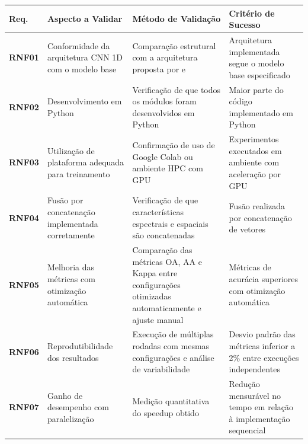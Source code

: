 \begin{quadro}[H]
    \centering
    \caption{Plano de verificação dos requisitos não funcionais}
    \begin{tabular}{|p{}|p{}|p{}|p{}|}
        \hline
        \rowcolor[HTML]{C0C0C0}
        \textbf{Req.} & \textbf{Aspecto a Validar} & \textbf{Método de Validação} & \textbf{Critério de Sucesso} \\
        \hline
        
        \textbf{RNF01} & Conformidade da arquitetura CNN 1D com o modelo base & Comparação estrutural com a arquitetura proposta por \cite{Souza2023} e \cite{Viel10064297} & Arquitetura implementada segue o modelo base especificado \\
        \hline
        
        \textbf{RNF02} & Desenvolvimento em Python & Verificação de que todos os módulos foram desenvolvidos em Python & Maior parte do código implementado em Python \\
        \hline
        
        \textbf{RNF03} & Utilização de plataforma adequada para treinamento & Confirmação de uso de Google Colab ou ambiente HPC com GPU & Experimentos executados em ambiente com aceleração por GPU \\
        \hline
        
        \textbf{RNF04} & Fusão por concatenação implementada corretamente & Verificação de que características espectrais e espaciais são concatenadas & Fusão realizada por concatenação de vetores \\
        \hline
        
        \textbf{RNF05} & Melhoria das métricas com otimização automática & Comparação das métricas OA, AA e Kappa entre configurações otimizadas automaticamente e ajuste manual & Métricas de acurácia superiores com otimização automática \\
        \hline
        
        \textbf{RNF06} & Reprodutibilidade dos resultados & Execução de múltiplas rodadas com mesmas configurações e análise de variabilidade & Desvio padrão das métricas inferior a 2\% entre execuções independentes \\
        \hline
        
        \textbf{RNF07} & Ganho de desempenho com paralelização & Medição quantitativa do speedup obtido & Redução mensurável no tempo em relação à implementação sequencial \\
        \hline
    \end{tabular}
    \label{tab:planoVerificacaoRNF}
\end{quadro}

